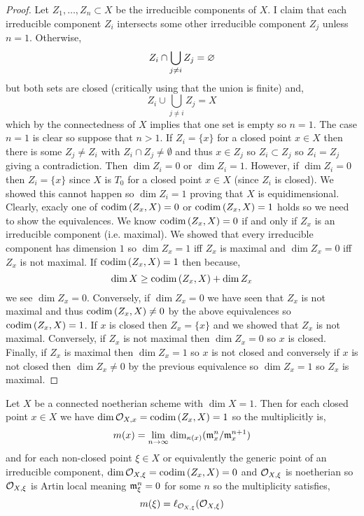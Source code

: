 \documentclass[12pt]{article}
\begin{document}
\begin{proof}
Let $Z_1, \dots, Z_n \subset X$ be the irreducible components of $X$. I claim that each irreducible component $Z_i$ intersects some other irreducible component $Z_j$ unless $n = 1$. Otherwise,
\[ Z_i \cap \bigcup_{j \neq i} Z_j = \varnothing \]
but both sets are closed (critically using that the union is finite) and,
\[ Z_i \cup \bigcup_{j \neq i} Z_j = X \]
which by the connectedness of $X$ implies that one set is empty so $n = 1$. The case $n = 1$ is clear so suppose that $n > 1$. If $Z_i = \{ x \}$ for a closed point $x \in X$ then there is some $Z_j \neq Z_i$ with $Z_i \cap Z_j \neq \emptyset$ and thus $x \in Z_j$ so $Z_i \subset Z_j$ so $Z_i = Z_j$ giving a contradiction. Then $\dim{Z_i} = 0$ or $\dim{Z_i} = 1$. However, if $\dim{Z_i} = 0$ then $Z_i = \{ x \}$ since $X$ is $T_0$ for a closed point $x \in X$ (since $Z_i$ is closed). We showed this cannot happen so $\dim{Z_i} = 1$ proving that $X$ is equidimensional. 
\bigskip\\
Clearly, exacly one of $\mathrm{codim}\left( Z_x, X \right) = 0$ or $\mathrm{codim}\left( Z_x, X \right) = 1$ holds so we need to show the equivalences. We know $\mathrm{codim}\left( Z_x, X \right) = 0$ if and only if $Z_x$ is an irreducible component (i.e. maximal). We showed that every irreducible component has dimension $1$ so $\dim{Z_x} = 1$ iff $Z_x$ is maximal and $\dim{Z_x} = 0$ iff $Z_x$ is not maximal. If $\mathrm{codim}\left( Z_x,X \right) = 1$ then because,
\[ \dim{X} \ge \mathrm{codim}\left( Z_x,X \right) + \dim{Z_x} \]
we see $\dim{Z_x} = 0$. Conversely, if $\dim{Z_x} = 0$ we have seen that $Z_x$ is not maximal and thus $\mathrm{codim}\left( Z_x, X \right) \neq 0$ by the above equivalences so $\mathrm{codim}\left( Z_x, X \right) = 1$. If $x$ is closed then $Z_x = \{ x \}$ and we showed that $Z_x$ is not maximal. Conversely, if $Z_x$ is not maximal then $\dim{Z_x} = 0$ so $x$ is closed. Finally, if $Z_x$ is maximal then $\dim{Z_x} = 1$ so $x$ is not closed and conversely if $x$ is not closed then $\dim{Z_x} \neq 0$ by the previous equivalence so $\dim{Z_x} = 1$ so $Z_x$ is maximal. 
\end{proof}

\begin{cor}
Let $X$ be a connected noetherian scheme with $\dim{X} = 1$. Then for each closed point $x \in X$ we have $\dim{\mathcal{O}_{X, x}} = \mathrm{codim}\left( Z_x,X \right) = 1$
so the multiplicitly is,
\[ m(x) = \lim_{n \to \infty} \dim_{\kappa(x)}(\mathfrak{m}_x^n / \mathfrak{m}_x^{n+1}) \]
and for each non-closed point $\xi \in X$ or equivalently the generic point of an irreducible component, $\dim{\mathcal{O}_{X, \xi}} = \mathrm{codim}\left( Z_x,X \right) = 0$
and $\mathcal{O}_{X, \xi}$ is noetherian so $\mathcal{O}_{X, \xi}$ is Artin local meaning $\mathfrak{m}_{\xi}^n = 0$ for some $n$ so the multiplicity satisfies,
\[ m(\xi) = \ell_{\mathcal{O}_{X, \xi}}(\mathcal{O}_{X, \xi}) \]
\end{cor}
\end{document}
